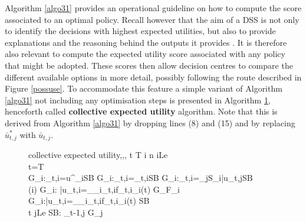 Algorithm \ref{algo31} provides an operational guideline on how to compute the score associated to an optimal policy. Recall however that the aim of a DSS is not only to identify the decisions with highest expected utilities, but also to provide explanations and the reasoning behind the outputs it provides \citep{French2009}. It is therefore also relevant to compute the expected utility score associated with any policy that might be adopted. These scores then allow decision centres to compare the different available options in more detail, possibly following the route described in Figure \ref{possuse}. To accommodate this feature  a simple variant of Algorithm \ref{algo31}  not including any  optimisation steps is presented in Algorithm \ref{algo:exput}, henceforth called \textbf{collective expected utility} algorithm. Note that this is derived from Algorithm \ref{algo31} by dropping lines (8) and (15) and by replacing $\bar{u}^{*}_{t,j}$ with $\bar{u}_{t,j}$.

\begin{figure}
\begin{center}
\begin{pseudocode}[ruled]{ collective expected utility}{,,\Gr,}
\label{algo:exput}
\FOR t \GETS T  \DO \BEGIN
\FOR i \GETS n  \DO \BEGIN
\IF i\in Le\\ \BEGIN  \IF t=T \\
\BEGIN G_i:_{t,i}=u^{\Gr}_i\longrightarrow SB  \END
\ELSE G_i:_{t,i}=_{t,i}\longrightarrow SB 
\END
\ELSE G_i:_{t,i}=\sum_{j\in S_i}\bar{u}_{t,j}\longrightarrow SB  \\
\IF (i)   \THEN \BEGIN G_i: \bar{u}_{t,i}=\int_{_i}_{t,i}f_{t,i}\dr {}_i(t) \longrightarrow G_{F_i}  \END
\ELSE \BEGIN G_i:\bar{u}_{t,i}=\int_{_i}_{t,i}f_{t,i}\dr {}_i(t) \longrightarrow SB \\
\IF t  \THEN \BEGIN \FOREACH j\in Le  \DO \BEGIN  SB: _{t-1,j} \longrightarrow G_j \END \END
\END
\END \END 
\end{pseudocode}
\end{center}
\end{figure}


